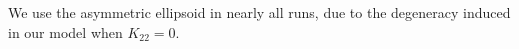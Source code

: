 We use the asymmetric ellipsoid in nearly all runs, due to the degeneracy induced in our model when $K_{22} = 0$.







